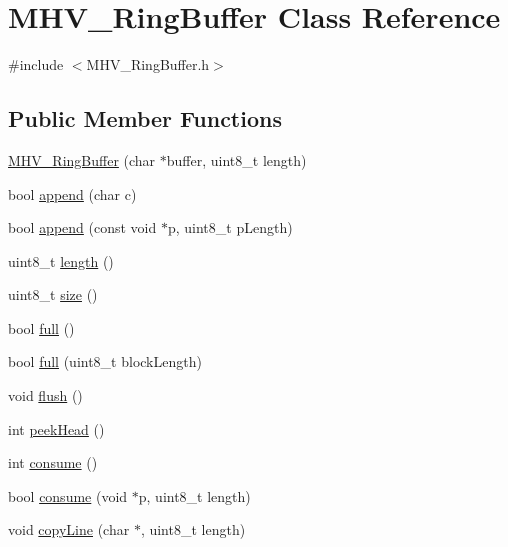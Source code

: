 \hypertarget{class_m_h_v___ring_buffer}{
\section{\-M\-H\-V\-\_\-\-Ring\-Buffer \-Class \-Reference}
\label{class_m_h_v___ring_buffer}
}


{\ttfamily \#include $<$\-M\-H\-V\-\_\-\-Ring\-Buffer.\-h$>$}

\subsection*{\-Public \-Member \-Functions}
\begin{DoxyCompactItemize}
\item 
\hyperlink{class_m_h_v___ring_buffer_a55648511cbc03ac09ddc8e9c2a7d96ec}{\-M\-H\-V\-\_\-\-Ring\-Buffer} (char $\ast$buffer, uint8\-\_\-t length)
\item 
bool \hyperlink{class_m_h_v___ring_buffer_ae9fb1751555f666d4d7dd9ff5b8d4684}{append} (char c)
\item 
bool \hyperlink{class_m_h_v___ring_buffer_a71e1ef04975d8884fc70d6ea80f6c22f}{append} (const void $\ast$p, uint8\-\_\-t p\-Length)
\item 
uint8\-\_\-t \hyperlink{class_m_h_v___ring_buffer_a750505bbe97b6a2fc307f8c947a187c9}{length} ()
\item 
uint8\-\_\-t \hyperlink{class_m_h_v___ring_buffer_a2935a046213f670d986a82a25e2a0fc3}{size} ()
\item 
bool \hyperlink{class_m_h_v___ring_buffer_aa876ab27b4e578ccdef251976def01b0}{full} ()
\item 
bool \hyperlink{class_m_h_v___ring_buffer_a3bfc37ec8232fe0f2016232951ee67ee}{full} (uint8\-\_\-t block\-Length)
\item 
void \hyperlink{class_m_h_v___ring_buffer_aa9e34685f3881cc967493e3e8c9b839e}{flush} ()
\item 
int \hyperlink{class_m_h_v___ring_buffer_a8577d7eb16e192771fd2af14d667ffc6}{peek\-Head} ()
\item 
int \hyperlink{class_m_h_v___ring_buffer_addec99c97519a0241e7d4be65e432df6}{consume} ()
\item 
bool \hyperlink{class_m_h_v___ring_buffer_af4d35b76c16bd42d9c5568b084310eeb}{consume} (void $\ast$p, uint8\-\_\-t length)
\item 
void \hyperlink{class_m_h_v___ring_buffer_a8232f22addc138be447ada8393554961}{copy\-Line} (char $\ast$, uint8\-\_\-t length)
\end{DoxyCompactItemize}



